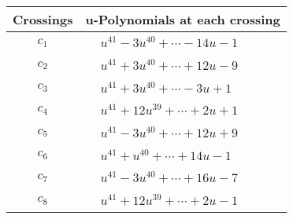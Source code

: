 \documentclass[1p]{elsarticle_modified}
\theoremstyle{definition}
\begin{document}
\begin{tabular}{m{50pt}|m{274pt}}
Crossings & \hspace{64pt}u-Polynomials at each crossing \\
\hline $$\begin{aligned}c_{1}\end{aligned}$$&$\begin{aligned}
&u^{41}-3 u^{40}+\cdots-14 u-1
\end{aligned}$\\
\hline $$\begin{aligned}c_{2}\end{aligned}$$&$\begin{aligned}
&u^{41}+3 u^{40}+\cdots+12 u-9
\end{aligned}$\\
\hline $$\begin{aligned}c_{3}\end{aligned}$$&$\begin{aligned}
&u^{41}+3 u^{40}+\cdots-3 u+1
\end{aligned}$\\
\hline $$\begin{aligned}c_{4}\end{aligned}$$&$\begin{aligned}
&u^{41}+12 u^{39}+\cdots+2 u+1
\end{aligned}$\\
\hline $$\begin{aligned}c_{5}\end{aligned}$$&$\begin{aligned}
&u^{41}-3 u^{40}+\cdots+12 u+9
\end{aligned}$\\
\hline $$\begin{aligned}c_{6}\end{aligned}$$&$\begin{aligned}
&u^{41}+u^{40}+\cdots+14 u-1
\end{aligned}$\\
\hline $$\begin{aligned}c_{7}\end{aligned}$$&$\begin{aligned}
&u^{41}-3 u^{40}+\cdots+16 u-7
\end{aligned}$\\
\hline $$\begin{aligned}c_{8}\end{aligned}$$&$\begin{aligned}
&u^{41}+12 u^{39}+\cdots+2 u-1
\end{aligned}$\\

\end{tabular}
\end{document}
